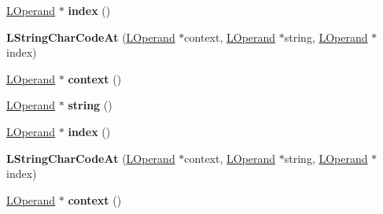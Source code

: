 \begin{DoxyCompactItemize}
\item 
\hyperlink{classv8_1_1internal_1_1_l_operand}{L\+Operand} $\ast$ {\bfseries index} ()\hypertarget{classv8_1_1internal_1_1_l_string_char_code_at_a6d34721abedba9af5cdca55a18b388c2}{}\label{classv8_1_1internal_1_1_l_string_char_code_at_a6d34721abedba9af5cdca55a18b388c2}

\item 
{\bfseries L\+String\+Char\+Code\+At} (\hyperlink{classv8_1_1internal_1_1_l_operand}{L\+Operand} $\ast$context, \hyperlink{classv8_1_1internal_1_1_l_operand}{L\+Operand} $\ast$string, \hyperlink{classv8_1_1internal_1_1_l_operand}{L\+Operand} $\ast$index)\hypertarget{classv8_1_1internal_1_1_l_string_char_code_at_a2ea27a024b27a329ff76364ab55c7cd1}{}\label{classv8_1_1internal_1_1_l_string_char_code_at_a2ea27a024b27a329ff76364ab55c7cd1}

\item 
\hyperlink{classv8_1_1internal_1_1_l_operand}{L\+Operand} $\ast$ {\bfseries context} ()\hypertarget{classv8_1_1internal_1_1_l_string_char_code_at_a9482271a8172ce48522512f232ac24aa}{}\label{classv8_1_1internal_1_1_l_string_char_code_at_a9482271a8172ce48522512f232ac24aa}

\item 
\hyperlink{classv8_1_1internal_1_1_l_operand}{L\+Operand} $\ast$ {\bfseries string} ()\hypertarget{classv8_1_1internal_1_1_l_string_char_code_at_a935ea67cb0997a56225d8943bd28acfc}{}\label{classv8_1_1internal_1_1_l_string_char_code_at_a935ea67cb0997a56225d8943bd28acfc}

\item 
\hyperlink{classv8_1_1internal_1_1_l_operand}{L\+Operand} $\ast$ {\bfseries index} ()\hypertarget{classv8_1_1internal_1_1_l_string_char_code_at_a6d34721abedba9af5cdca55a18b388c2}{}\label{classv8_1_1internal_1_1_l_string_char_code_at_a6d34721abedba9af5cdca55a18b388c2}

\item 
{\bfseries L\+String\+Char\+Code\+At} (\hyperlink{classv8_1_1internal_1_1_l_operand}{L\+Operand} $\ast$context, \hyperlink{classv8_1_1internal_1_1_l_operand}{L\+Operand} $\ast$string, \hyperlink{classv8_1_1internal_1_1_l_operand}{L\+Operand} $\ast$index)\hypertarget{classv8_1_1internal_1_1_l_string_char_code_at_a2ea27a024b27a329ff76364ab55c7cd1}{}\label{classv8_1_1internal_1_1_l_string_char_code_at_a2ea27a024b27a329ff76364ab55c7cd1}

\item 
\hyperlink{classv8_1_1internal_1_1_l_operand}{L\+Operand} $\ast$ {\bfseries context} ()\hypertarget{classv8_1_1internal_1_1_l_string_char_code_at_a9482271a8172ce48522512f232ac24aa}{}\label{classv8_1_1internal_1_1_l_string_char_code_at_a9482271a8172ce48522512f232ac24aa}


\end{DoxyCompactItemize}
